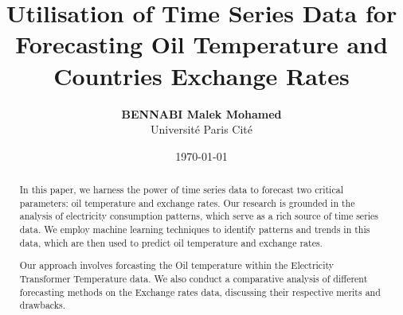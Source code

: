 \documentclass[10pt]{article}
\begin{document}
\title{\textbf{Utilisation of Time Series Data for Forecasting Oil Temperature and Countries Exchange Rates}}
\author{\textbf{BENNABI Malek Mohamed} \\ Université Paris Cité}
\date{\today}


\maketitle

\begin{mdframed}[backgroundcolor=gray!20] %
\begin{abstract}

\noindent\makebox[\linewidth]{\rule{\textwidth}{1pt}}
In this paper, we harness the power of time series data to forecast two critical parameters: oil temperature and exchange rates. Our research is grounded in the analysis of electricity consumption patterns, which serve as a rich source of time series data. We employ machine learning techniques to identify patterns and trends in this data, which are then used to predict oil temperature and exchange rates.

Our approach involves forcasting the Oil temperature within the Electricity Transformer Temperature data. We also conduct a comparative analysis of different forecasting methods on the Exchange rates data, discussing their respective merits and drawbacks.\newline
\noindent\makebox[\linewidth]{\rule{\textwidth}{1pt}}

\end{abstract}
\end{mdframed}

\vspace{0.5cm} %
\end{document}
